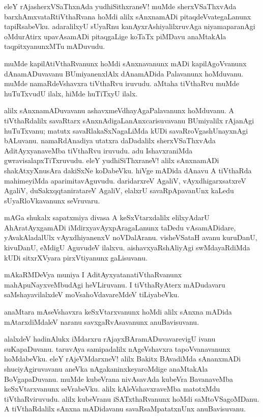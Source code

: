 \documentclass{article}
\begin{document}
\begin{mn}
eleY rAjasherxVSaThxnAda yudhiSithxraneV! muMde sherxVSaThxvAda barxhAmxvataRtiVthaRvana hoMdi 
alilx sAnxnamADi pitaqdeVvategaLanunx tapiRsabeVku. adaralilxyU sUyaRnu kanAyxrAshiyalilxruvAga 
niyamaparanAgi oMdurAtirx upavAsamADi pitaqgaLige koTaTx piMDavu anaMtakAla taqpitxyanunxMTu
mADuvudu.
\end{mn}

\begin{mn}
muMde kapilAtiVthaRvanunx hoMdi sAnxnavanunx  mADi kapilAgoVvanunx dAnamADuvavanu BUmiyanenxlAlx 
dAnamADida Palavanunx hoMduvanu. muMde namaRdeVshavxra tiVthaRvu iruvudu. aMtaha tiVthaRvu muMde 
huTuTxvudU ilalx, hiMde huTiTxyU ilalx.
\end{mn}

\begin{mn}
alilx sAnxnamADuvavanu ashavxmeVdhayAgaPalavanunx hoMduvanu. A tiVthaRdalilx savaRtarx 
sAnxnAdigaLanAnxcarisuvavanu BUmiyalilx rAjanAgi huTuTxvanu; matutx savaRlakaSxNagaLiMda
kUDi savaRroVgashUnayxnAgi bALuvanu. namaRdAnadiya utatxra daDadalilx sherxVSaThxvAda 
AditAyxyanaveMba tiVthaRvu iruvudu. adu IshavxraniMda gwravisalapxTiTxruvudu. eleY yudhiSiThxraneV!
alilx sAnxnamADi shakAtxyXnusAra dakiSxNe koDabeVku. hiVge mADida dAnavu A tiVthaRda mahimeyiMda 
aparimitavAguvudu. daridarxreV AgaliV, vAyxdhigarxsatxreV AgaliV, duSakxqqtaniratareV AgaliV,
elalxrU savaRpApavanUnx kaLedu sUyaRloVkavanunx seVruvaru.
\end{mn}

\begin{mn}
mAGa shukalx sapatxmiya divasa A keSxVtarxdalilx elilxyAdarU AhAratAyxgamADi 
iMdirxyavAyxpAragaLanunx taDedu vAsamADidare, yAvakAladalUlx vAyxdhiyanenxV noVDalAranu.
visheVSataH avanu kuruDanU, kivuDanU, eMdigU AguvudeV ilalxvu. aishavxyaRshAliyAgi swMdayaRdiMda 
kUDi sitxrXVyara pirxVtiyanunx gaLisuvanu.
\end{mn}

\begin{mn}
mAkaRMDeVya muniya I AditAyxyatanatiVthaRvanunx mahApuNayxveMbudAgi heVLiruvanu. I tiVthaRyAterx
mADudavaru saMshayavilalxdeV moVsahoVdavareMdeV tiLiyabeVku.
\end{mn}

\begin{mn}
anaMtara mAseVshavxra keSxVtarxvanunx hoMdi alilx sAnxna mADida mAtarxdiMdaleV naranu 
savxgaRvAsavanunx anuBavisuvanu.
\end{mn}

\begin{mn}
alalxdeV hadinAlukx iMdarxru rAjayxBAramADuvavarevigU ivanu suKapaDuvanu. taruvAya samipadalilx
nAgeVshavxra tapoVvanavanunx hoMdabeVku. eleY rAjeVMdarxneV! alilx Bakitx BAvadiMda sAnanxmADi 
shuciyAgiruvavanu aneVka nAgakaninxkeyaroMdige anaMtakAla 
BoVgapaDuvanu. muMde kubeVrana nivAsavAda kubeVra BavanaveMba keSxVtarxvanunx seVrabeVku.
alilx kAleVshavxraveMba matotxMdu tiVthaRviruvudu. alilx kubeVranu iSATxthaRvanunx hoMdi 
saMtoVSagoMDanu. A tiVthaRdalilx sAnxna mADidavanu savaRsaMpatatxnUnx anuBavisuvanu.
\end{mn}
\end{document}
